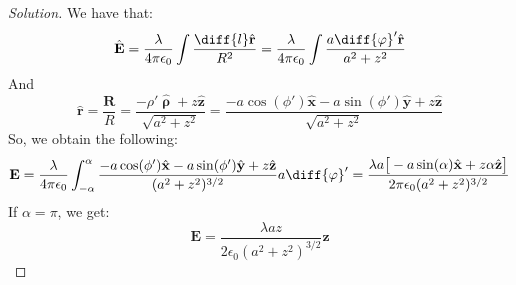 \documentclass[crop=false,class=article,oneside]{standalone}
\begin{document}
    \begin{proof}[Solution]
        We have that:
        \begin{equation*}
            \hat{\mathbf{E}}
            =\frac{\lambda}{4\pi\epsilon_{0}}
            \int\frac{\diff{l}\hat{\mathbf{r}}}{R^{2}}
            =\frac{\lambda}{4\pi\epsilon_0}
            \int\frac{a\diff{\varphi}'\hat{\mathbf{r}}}
                     {a^{2}+z^{2}}
        \end{equation*}
        And
        \begin{equation*}
            \hat{\mathbf{r}}=\frac{\mathbf{R}}{R}
            =\frac{-\rho'\hat{\boldsymbol{\uprho}}
            +z\hat{\mathbf{z}}}{\sqrt{a^{2}+z^{2}}}
            =\frac{-a\cos(\phi')\hat{\mathbf{x}}
            -a\sin(\phi')\hat{\mathbf{y}}
            +z\hat{\mathbf{z}}}{\sqrt{a^{2}+z^{2}}}    
        \end{equation*}
        So, we obtain the following:
        \begin{equation*}
            \mathbf{E}
            =\frac{\lambda}{4\pi\epsilon_0}
            \int_{-\alpha}^{\alpha}
            \frac{-a\cos(\phi')\hat{\mathbf{x}}
                  -a\sin(\phi')\hat{\mathbf{y}}
                  +z\hat{\mathbf{z}}}
                 {(a^{2}+z^{2})^{3/2}}a\diff{\varphi}'
            =\frac{\lambda{a}\big[
                       -a\sin(\alpha)\hat{\mathbf{x}}
                       +z\alpha\hat{\mathbf{z}}
                   \big]}
                  {2\pi\epsilon_{0}(a^{2}+z^{2})^{3/2}}
        \end{equation*}
        If $\alpha=\pi$, we get:
        \begin{equation*}
            \mathbf{E}
            =\frac{\lambda az}
                  {2\epsilon_{0}(a^{2}+z^{2})^{3/2}}
            \hat{\mathbf{z}}
        \end{equation*}
    \end{proof}
    \newpage
\end{document}
